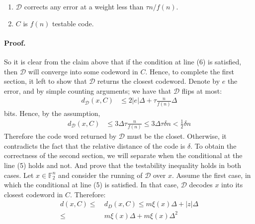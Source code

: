 \documentclass[sigplan,screen]{acmart}
\begin{document}
\begin{multicols*}{2}
  \begin{enumerate}
    \item $\mathcal{D}$ corrects any error at a weight less than $\tau n / f\left(n\right)$.   
    \item $C$ is $f\left( n \right)$ testable code.
  \end{enumerate}


  \paragraph{Proof.} So it is clear from the claim above that if the condition at line (6) is satisfied, then $\mathcal{D}$  will converge into some codeword in $C$. Hence, to complete the first section, it left to show that $\mathcal{D}$ returns the closest codeword. Denote by $e$ the error, and by simple counting arguments; we have that $\mathcal{D}$ flips at most:  
  \begin{equation*}
    \begin{split}
      d_{\mathcal{D}}\left( x, C \right) & \le 2|e|\Delta + \tau \frac{n}{f\left( n \right)}\Delta
    \end{split}
  \end{equation*}
  bits. Hence, by the assumption, 
  \begin{equation*}
    \begin{split}
      d_{\mathcal{D}}\left( x, C \right) & \le 3\Delta \tau \frac{n}{f\left( n \right)} \le 3\Delta \tau\delta n < \frac{1}{2} \delta n  
    \end{split}
  \end{equation*}
  Therefore the code word returned by $\mathcal{D}$ must be the closet. Otherwise, it contradicts the fact that the relative distance of the code is $\delta$.
  To obtain the correctness of the second section, we will separate when the conditional at the line (5) holds and not. And prove that the testability inequality holds in both cases. 
  Let $x \in \mathbb{F}_{2}^{n}$ and consider the running of $\mathcal{D}$ over $x$. Assume the first case, in which the conditional at line (5) is satisfied. In that case, $\mathcal{D}$ decodes $x$ into its closest codeword in $C$. Therefore:
  \begin{equation*}
    \begin{split}
      d\left( x, C \right) \le & \ d_{D} \left( x, C \right) \le m\xi\left( x \right)\Delta +  |z|\Delta  \\ \le &  \  m\xi\left( x \right)\Delta + m\xi\left( x \right)  \Delta^{2} \\ 

\end{split}
\end{equation*}
\end{multicols*}
\end{document}
